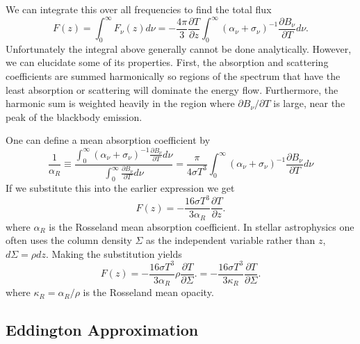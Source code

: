 We can integrate this over all frequencies to find the total flux 
\begin{equation}
F(z) = \int_0^\infty F_\nu (z) d \nu = -\frac{4\pi}{3} \frac{\partial
  T}{\partial z} \int_0^\infty \left (\alpha_\nu
+\sigma_\nu\right)^{-1} \frac{\partial B_\nu}{\partial T} d\nu.
\label{eq:108}
\end{equation}
Unfortunately the integral above generally cannot be done
analytically.   However, we can elucidate some of its properties.  First, the
absorption and scattering coefficients are summed harmonically so
regions of the spectrum that have the least absorption or scattering
will dominate the energy flow.  Furthermore, the harmonic sum is
weighted heavily in the region where $\partial B_\nu/\partial T$ is
large, near the peak of the blackbody emission.

One can define a mean absorption coefficient by
\begin{equation}
\frac{1}{\alpha_R} \equiv \frac{\int_0^\infty \left (\alpha_\nu
+\sigma_\nu\right)^{-1} \frac{\partial B_\nu}{\partial T}
d\nu}{\int_0^\infty \frac{\partial B_\nu}{\partial T} d\nu} =
\frac{\pi}{4\sigma T^3}
\int_0^\infty \left (\alpha_\nu
+\sigma_\nu\right)^{-1} \frac{\partial B_\nu}{\partial T}
d\nu
\label{eq:109}
\end{equation}
If we substitute this into the earlier expression we get
\begin{equation}
F(z) = -\frac{16 \sigma T^3}{3\alpha_R} \frac{\partial T}{\partial z}.
\label{eq:110}
\end{equation}
where $\alpha_R$ is the Rosseland mean absorption coefficient.  In
stellar astrophysics one often uses the column density $\Sigma$ as the
independent variable rather than $z$, $d\Sigma = \rho dz$.  Making
the substitution yields
\begin{equation}
F(z) = -\frac{16 \sigma T^3}{3\alpha_R} \rho \frac{\partial
  T}{\partial \Sigma}.= -\frac{16 \sigma T^3}{3\kappa_R} \frac{\partial T}{\partial \Sigma}.
\label{eq:111}
\end{equation}
where $\kappa_R=\alpha_R/\rho$ is the Rosseland mean opacity.

\subsection{Eddington Approximation}
\label{sec:eddingt-appr}

